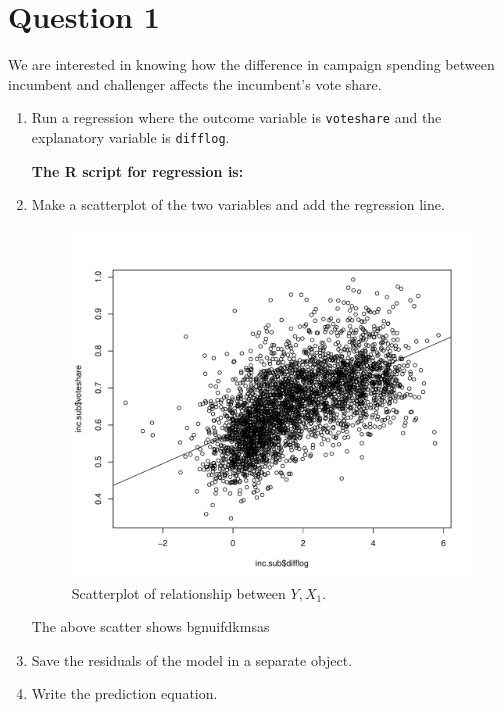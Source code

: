 \documentclass[12pt,letterpaper]{article}
\begin{document}
\section*{Question 1}
\vspace{.25cm}
\noindent We are interested in knowing how the difference in campaign spending between incumbent and challenger affects the incumbent's vote share. 
	\begin{enumerate}
		\item Run a regression where the outcome variable is \texttt{voteshare} and the explanatory variable is \texttt{difflog}.
		
\textbf{		The R script for regression is:}
		  
		
		
		\item Make a scatterplot of the two variables and add the regression line. 
		
		  
		
		
		\begin{figure}[h!]\centering	\caption{\footnotesize Scatterplot of relationship between $Y, X_1$.}	
		
		\includegraphics[width=.85\textwidth]{plot1.pdf}
		
		\end{figure}
		
		The above scatter shows bgnuifdkmsas
		
		\vspace*{2cm}
		
		\item Save the residuals of the model in a separate object.	\vspace{7cm}
		\item Write the prediction equation.
	\end{enumerate}
	
\end{document}
